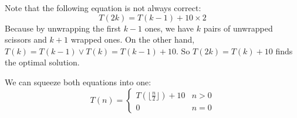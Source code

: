 \documentclass{book}
\begin{document}
\begin{itemize}
\begin{itemize}
\begin{itemize}
\begin{enumerate}
\begin{equation*}
					\end{equation*}
					Note that the following equation is not always correct:
					\begin{equation*}
						T(2k) = T(k - 1) + 10 \times 2
					\end{equation*}
					Because by unwrapping the first $k - 1$ ones, we have $k$ pairs of unwrapped scissors and $k + 1$ wrapped ones. On the other hand, $T(k) = T(k - 1) \lor T(k) = T(k - 1) + 10$. So $T(2k) = T(k) + 10$ finds the optimal solution.
				\end{enumerate}
				We can squeeze both equations into one:
				\begin{equation*}
					T(n) = \begin{cases}
						T(\lfloor \frac{n}{2} \rfloor) + 10 & n > 0 \\
						0 & n = 0
					\end{cases}
				\end{equation*}    	
			\end{itemize}
		\end{itemize}
	\end{itemize}
	
\end{document}
